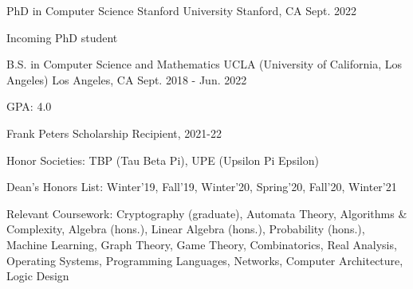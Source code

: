 

\begin{cventries}

\cventry
    {PhD in Computer Science} %
    {Stanford University} %
    {Stanford, CA} %
    {Sept. 2022} %
    {
      \begin{cvitems} %
        \item {Incoming PhD student}
      \end{cvitems}
    }

  \cventry
    {B.S. in Computer Science and Mathematics} %
    {UCLA (University of California, Los Angeles)} %
    {Los Angeles, CA} %
    {Sept. 2018 - Jun. 2022} %
    {
      \begin{cvitems} %
        \item {GPA: 4.0}
        \item {Frank Peters Scholarship Recipient, 2021-22}
        \item{Honor Societies: TBP (Tau Beta Pi), UPE (Upsilon Pi Epsilon)}
        \item {Dean's Honors List: Winter'19, Fall'19, Winter'20, Spring'20, Fall'20, Winter'21}
        \item {Relevant Coursework: Cryptography (graduate), Automata Theory, Algorithms \& Complexity, Algebra (hons.), Linear Algebra (hons.), Probability (hons.), Machine Learning, Graph Theory, Game Theory, Combinatorics, Real Analysis, Operating Systems, Programming Languages, Networks, Computer Architecture, Logic Design}
      \end{cvitems}
    }

\end{cventries}
